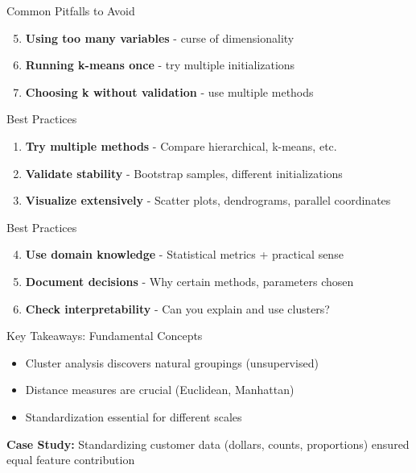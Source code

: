 \documentclass[aspectratio=169,ignorenonframetext]{beamer}
\begin{document}
\begin{frame}{Common Pitfalls to Avoid}
\begin{enumerate}
\setcounter{enumi}{4}
\item
  \textbf{Using too many variables} - curse of dimensionality
\item
  \textbf{Running k-means once} - try multiple initializations
\item
  \textbf{Choosing k without validation} - use multiple methods
\end{enumerate}
\end{frame}

\begin{frame}{Best Practices}
\begin{enumerate}
\item
  \textbf{Try multiple methods} - Compare hierarchical, k-means, etc.
\item
  \textbf{Validate stability} - Bootstrap samples, different
  initializations
\item
  \textbf{Visualize extensively} - Scatter plots, dendrograms, parallel
  coordinates
\end{enumerate}
\end{frame}

\begin{frame}{Best Practices}
\begin{enumerate}
\setcounter{enumi}{3}
\item
  \textbf{Use domain knowledge} - Statistical metrics + practical sense
\item
  \textbf{Document decisions} - Why certain methods, parameters chosen
\item
  \textbf{Check interpretability} - Can you explain and use clusters?
\end{enumerate}
\end{frame}

\begin{frame}{Key Takeaways: Fundamental Concepts}
\begin{itemize}
\item
  Cluster analysis discovers natural groupings (unsupervised)
\item
  Distance measures are crucial (Euclidean, Manhattan)
\item
  Standardization essential for different scales
\end{itemize}

\textbf{Case Study:} Standardizing customer data (dollars, counts,
proportions) ensured equal feature contribution
\end{frame}
\end{document}
